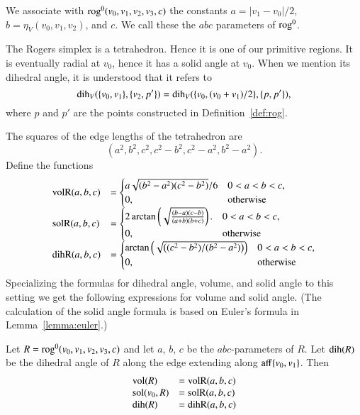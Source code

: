\begin{definition}
We associate with ${\operatorname{rog}}^0(v_0,v_1,v_2,v_3,c)$ the constants
$a=|v_1-v_0|/2$, $b=\eta_V(v_0,v_1,v_2)$, and $c$.
We call these the $abc$ parameters of ${\operatorname{rog}}^0$. 
\end{definition}

The Rogers simplex is a tetrahedron.  Hence it is one of our
primitive regions.  It is eventually radial at $v_0$, hence
it has a solid angle at $v_0$.  When we mention its dihedral
angle, it is understood that it refers to 
   $$
   \operatorname{dih}_V(\{v_0,v_1\},\{v_2,p'\})=\operatorname{dih}_V(\{v_0,(v_0+v_1)/2\},\{p,p'\}),
   $$
where $p$ and $p'$ are the points 
constructed in Definition~\ref{def:rog}.

The squares of the edge lengths of the tetrahedron are
   $$
   (a^2,b^2,c^2,c^2-b^2,c^2-a^2,b^2-a^2).
   $$
Define the functions
   $$
   \begin{array}{lll}
     {\operatorname{volR}}(a,b,c) &= \begin{cases}
       a\sqrt{(b^2-a^2)(c^2-b^2)}/6& 0 < a < b < c,\\
       0,&\text{otherwise}
       \end{cases}\\
     {\operatorname{solR}}(a,b,c) &= \begin{cases}
      2 \arctan\left(\sqrt{\frac{(b-a) (c-b)}{(a+b)
   (b+c)}}\right).& 0 < a < b < c,\\
      0,&\text{otherwise}
     \end{cases}\\
     {\operatorname{dihR}}(a,b,c) &= \begin{cases}
      \arctan\left(\sqrt{\left((c^2 - b^2)/(b^2 - a^2)\right)}\right)
      & 0 < a < b < c,\\
      0,&\text{otherwise}
     \end{cases}
     \end{array}
   $$
Specializing the formulas for dihedral angle, volume, and solid angle to this
setting we get the following expressions for volume and solid angle.
(The calculation of the
 solid angle formula is based on Euler's formula in 
Lemma~\ref{lemma:euler}.)

\begin{lemma}\label{lemma:rog:abc} 
Let $R={\operatorname{rog}}^0(v_0,v_1,v_2,v_3,c)$ and let $a$, $b$,
$c$ be the $abc$-parameters of $R$.  Let ${\operatorname{dih}}(R)$ be the dihedral
angle of $R$ along the edge extending along ${\operatorname{aff}}\{v_0,v_1\}$.  Then
$$
\begin{array}{lll}
{\operatorname{vol}}(R) &= {\operatorname{volR}}(a,b,c)\\
{\operatorname{sol}}(v_0,R) &= {\operatorname{solR}}(a,b,c)\\
{\operatorname{dih}}(R) &= {\operatorname{dihR}}(a,b,c)\\
\end{array}
$$
\end{lemma}






